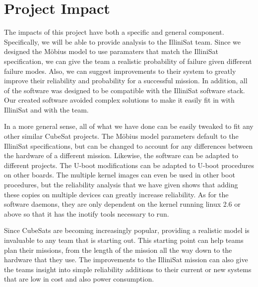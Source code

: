 \section{Project Impact}\label{sec:impact}

The impacts of this project have both a specific and general component. Specifically, 
we will be able to provide analysis to the IlliniSat team. Since we designed the
M\"obius model to use paramaters that match the IlliniSat specification, we
can give the team a realistic probability of failure given different failure modes.
Also, we can suggest improvements to their system to greatly improve their
reliability and probability for a successful mission. In addition, all of the software
was designed to be compatible with the IlliniSat software stack. Our created software
avoided complex solutions to make it easily fit in with IlliniSat and with the team.

In a more general sense, all of what we have done can be easily tweaked to
fit any other similar CubeSat projects. The M\"obius model parameters default
to the IlliniSat specifications, but can be changed to account for any differences
between the hardware of a different mission. Likewise, the software can be
adapted to different projects. The U-boot modifications can be adapted to U-boot
procedures on other boards. The multiple kernel images can even be used in other
boot procedures, but the reliability analysis that we have given shows that adding
these copies on multiple devices can greatly increase reliability. As for the software
daemons, they are only dependent on the kernel running linux 2.6 or above so that
it has the inotify tools necessary to run.

Since CubeSats are becoming increasingly popular, providing a realistic model is
invaluable to any team that is starting out. This starting point can help teams plan
their missions, from the length of the mission all the way down to the hardware that
they use. The improvements to the IlliniSat mission can also give the teams insight
into simple reliability additions to their current or new systems that are low in cost
and also power consumption.